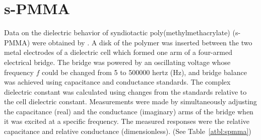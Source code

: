 \section{s-PMMA}

Data on the dielectric behavior of syndiotactic
poly(methylmethacrylate) (s-PMMA) were obtained
by .
A disk of the polymer was inserted between the two
metal electrodes of a dielectric cell which formed one arm of a
four-armed electrical bridge.
The bridge was powered by an oscillating voltage whose frequency
$f$ could be changed from 5 to
500000 hertz (Hz), and bridge balance was achieved using capacitance
and conductance standards.
The complex dielectric constant was calculated using changes
from the standards relative to the cell dielectric constant.
Measurements were made by simultaneously adjusting the capacitance
(real) and the conductance (imaginary) arms of the bridge
when it was excited at a specific frequency.
The measured responses were the relative capacitance and relative
conductance (dimensionless).
(See Table~\ref{atbl:spmma})
